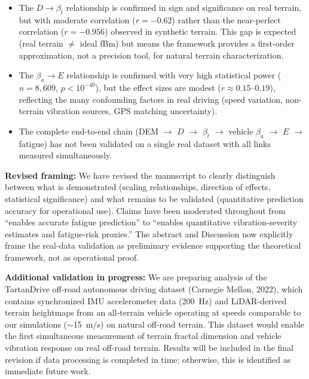 \documentclass[11pt]{article}
\begin{document}
\begin{itemize}[leftmargin=*]
\item The $D \rightarrow \beta_t$ relationship is confirmed in sign and significance on real terrain, but with moderate correlation ($r = -0.62$) rather than the near-perfect correlation ($r = -0.956$) observed in synthetic terrain. This gap is expected (real terrain $\neq$ ideal fBm) but means the framework provides a first-order approximation, not a precision tool, for natural terrain characterization.

\item The $\beta_a \rightarrow E$ relationship is confirmed with very high statistical power ($n = 8{,}609$, $p < 10^{-40}$), but the effect sizes are modest ($r \approx 0.15$--$0.19$), reflecting the many confounding factors in real driving (speed variation, non-terrain vibration sources, GPS matching uncertainty).

\item The complete end-to-end chain (DEM $\rightarrow$ $D$ $\rightarrow$ $\beta_t$ $\rightarrow$ vehicle $\beta_a$ $\rightarrow$ $E$ $\rightarrow$ fatigue) has not been validated on a single real dataset with all links measured simultaneously.
\end{itemize}

\textbf{Revised framing:} We have revised the manuscript to clearly distinguish between what is demonstrated (scaling relationships, direction of effects, statistical significance) and what remains to be validated (quantitative prediction accuracy for operational use). Claims have been moderated throughout from ``enables accurate fatigue prediction'' to ``enables quantitative vibration-severity estimates and fatigue-risk proxies.'' The abstract and Discussion now explicitly frame the real-data validation as preliminary evidence supporting the theoretical framework, not as operational proof.

\textbf{Additional validation in progress:} We are preparing analysis of the TartanDrive off-road autonomous driving dataset (Carnegie Mellon, 2022), which contains synchronized IMU accelerometer data (200~Hz) and LiDAR-derived terrain heightmaps from an all-terrain vehicle operating at speeds comparable to our simulations ($\sim$15~m/s) on natural off-road terrain. This dataset would enable the first simultaneous measurement of terrain fractal dimension and vehicle vibration response on real off-road terrain. Results will be included in the final revision if data processing is completed in time; otherwise, this is identified as immediate future work.
\end{document}
